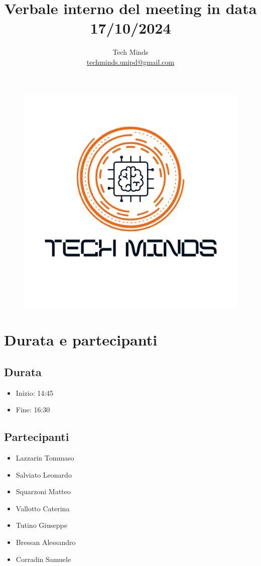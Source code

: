 \documentclass[10pt]{article}
\title{Verbale interno del meeting in data 17/10/2024}
\author{Tech Minds \\ \href{mailto:techminds.unipd@gmail.com}{techminds.unipd@gmail.com}}
\date{}
\begin{document}
\maketitle

\begin{figure}[h]
    \centering
    \includegraphics[width=0.3\linewidth]{../../../../assets/logo.png}
\end{figure}

\tableofcontents{\newpage}

\section{Durata e partecipanti}
\subsection{Durata}
\begin{itemize}
  \item Inizio: 14:45
  \item Fine: 16:30
\end{itemize}
\subsection{Partecipanti}
\begin{itemize}
    \item Lazzarin Tommaso
    \item Salviato Leonardo
    \item Squarzoni Matteo
    \item Vallotto Caterina
    \item Tutino Giuseppe
    \item Bressan Alessandro
    \item Corradin Samuele
  \end{itemize}
\end{document}
